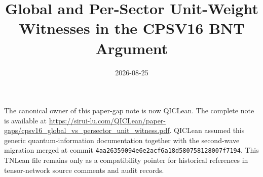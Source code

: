 \documentclass{article}
\title{Global and Per-Sector Unit-Weight Witnesses in the CPSV16 BNT Argument}
\author{}
\date{2026-08-25}
\begin{document}
\maketitle
{}

The canonical owner of this paper-gap note is now QICLean. The complete note
is available at
\url{https://sirui-lu.com/QICLean/paper-gaps/cpsv16_global_vs_persector_unit_witness.pdf}.
QICLean assumed this generic quantum-information documentation together with
the second-wave migration merged at commit
\texttt{4aa26359094e6e2acf6a18d580758128007f7194}. This TNLean file remains only
as a compatibility pointer for historical references in tensor-network source
comments and audit records.
\end{document}
